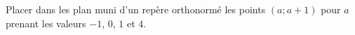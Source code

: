 
\begin{exercice}\label{exoSeconde-0007}

    Placer dans les plan muni d'un repère orthonormé les points \( (a;a+1)\) pour \( a\) prenant les valeurs \( -1\), \( 0\), \( 1\) et \( 4\).

\end{exercice}
